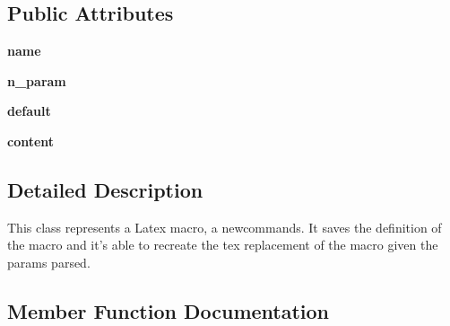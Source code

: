 \subsection*{Public Attributes}
\begin{DoxyCompactItemize}
\item 
\hypertarget{classtexla_1_1Parser_1_1Blocks_1_1Utilities_1_1MacroParser_1_1Macro_a0cc551d407614256f3fe8cfc497ab035}{}\label{classtexla_1_1Parser_1_1Blocks_1_1Utilities_1_1MacroParser_1_1Macro_a0cc551d407614256f3fe8cfc497ab035} 
{\bfseries name}
\item 
\hypertarget{classtexla_1_1Parser_1_1Blocks_1_1Utilities_1_1MacroParser_1_1Macro_aaadac96ac5b3068207eaffdd876ed7dd}{}\label{classtexla_1_1Parser_1_1Blocks_1_1Utilities_1_1MacroParser_1_1Macro_aaadac96ac5b3068207eaffdd876ed7dd} 
{\bfseries n\+\_\+param}
\item 
\hypertarget{classtexla_1_1Parser_1_1Blocks_1_1Utilities_1_1MacroParser_1_1Macro_ae29386b4c41336f5d171da8e39239cbd}{}\label{classtexla_1_1Parser_1_1Blocks_1_1Utilities_1_1MacroParser_1_1Macro_ae29386b4c41336f5d171da8e39239cbd} 
{\bfseries default}
\item 
\hypertarget{classtexla_1_1Parser_1_1Blocks_1_1Utilities_1_1MacroParser_1_1Macro_a15723fef45ee5c9e860b3a5c27303b1b}{}\label{classtexla_1_1Parser_1_1Blocks_1_1Utilities_1_1MacroParser_1_1Macro_a15723fef45ee5c9e860b3a5c27303b1b} 
{\bfseries content}
\end{DoxyCompactItemize}


\subsection{Detailed Description}
\begin{DoxyVerb}This class represents a Latex macro, a
newcommands. It saves the definition of the macro
and it's able to recreate the tex replacement of the macro
given the params parsed.\end{DoxyVerb}
 

\subsection{Member Function Documentation}
\hypertarget{classtexla_1_1Parser_1_1Blocks_1_1Utilities_1_1MacroParser_1_1Macro_a7f605660a8517687a8b13cfa51637047}{}\label{classtexla_1_1Parser_1_1Blocks_1_1Utilities_1_1MacroParser_1_1Macro_a7f605660a8517687a8b13cfa51637047} 
